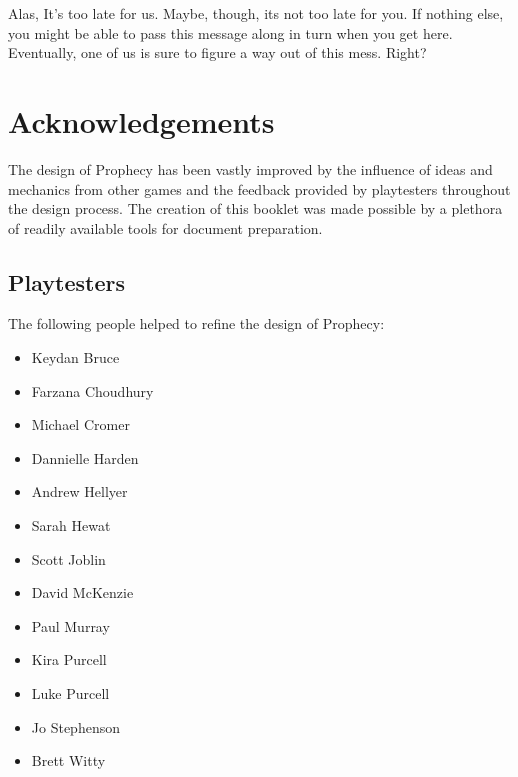 \documentclass[12pt, a5paper, parskip=half-]{scrartcl}
\begin{document}
Alas, It's too late for us. Maybe, though, its not too late for you.
If nothing else, you might be able to pass this message along in turn when you get here. 
Eventually, one of us is sure to figure a way out of this mess.
Right?

\newpage

\thispagestyle{titleheader}
\enlargethispage{3.5\baselineskip} %

\section*{Acknowledgements} \label{section:acknowledgements}
The design of Prophecy has been vastly improved by the influence of ideas and mechanics from other games and the feedback provided by playtesters throughout the design process.  
The creation of this booklet was made possible by a plethora of readily available tools for document preparation.

\subsection*{Playtesters} \label{subsection:playtesters}
The following people helped to refine the design of Prophecy:\vspace{-1.75ex}
\begin{multicols}{2}
\begin{itemize}[noitemsep,nolistsep,  leftmargin=0.68cm,topsep=-1ex]%
  \item Keydan Bruce
  \item Farzana Choudhury
  \item Michael Cromer
  \item Dannielle Harden
  \item Andrew Hellyer
  \item Sarah Hewat
  \item Scott Joblin
  \item David McKenzie
  \item Paul Murray
  \item Kira Purcell
  \item Luke Purcell
  \item Jo Stephenson
  \item Brett Witty
\end{itemize}
\end{multicols}
\end{document}
